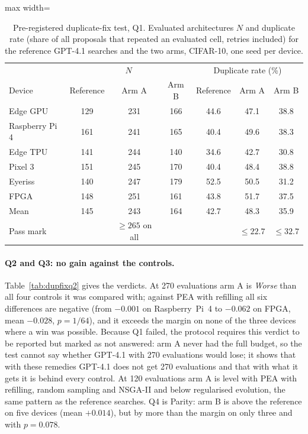 \documentclass[preprint,12pt]{elsarticle}
\begin{document}
\begin{table}[h]\centering\footnotesize
\caption{Pre-registered duplicate-fix test, Q1. Evaluated architectures $N$ and duplicate rate (share of all proposals that repeated an evaluated cell, retries included) for the reference GPT-4.1 searches and the two arms, CIFAR-10, one seed per device.}\label{tab:dupfixq1}
\setlength{\tabcolsep}{4pt}
\begin{adjustbox}{max width=\linewidth}
\begin{tabular}{l|ccc|ccc}
\toprule
 & \multicolumn{3}{c|}{$N$} & \multicolumn{3}{c}{Duplicate rate (\%)} \\
Device & Reference & Arm A & Arm B & Reference & Arm A & Arm B \\
\midrule
Edge GPU       & 129 & 231 & 166 & 44.6 & 47.1 & 38.8 \\
Raspberry Pi 4 & 161 & 241 & 165 & 40.4 & 49.6 & 38.3 \\
Edge TPU       & 141 & 244 & 140 & 34.6 & 42.7 & 30.8 \\
Pixel 3        & 151 & 245 & 170 & 40.4 & 48.4 & 38.8 \\
Eyeriss        & 140 & 247 & 179 & 52.5 & 50.5 & 31.2 \\
FPGA           & 148 & 251 & 161 & 43.8 & 51.7 & 37.5 \\
\midrule
Mean           & 145 & 243 & 164 & 42.7 & 48.3 & 35.9 \\
Pass mark      &     & $\ge265$ on all & & & $\le22.7$ & $\le32.7$ \\
\bottomrule
\end{tabular}
\end{adjustbox}
\end{table}

\paragraph{Q2 and Q3: no gain against the controls.} Table~\ref{tab:dupfixq2} gives the verdicts. At 270 evaluations arm A is \emph{Worse} than all four controls it was compared with; against PEA with refilling all six differences are negative (from $-0.001$ on Raspberry~Pi~4 to $-0.062$ on FPGA, mean $-0.028$, $p=1/64$), and it exceeds the margin on none of the three devices where a win was possible. Because Q1 failed, the protocol requires this verdict to be reported but marked as not answered: arm A never had the full budget, so the test cannot say whether GPT-4.1 with 270 evaluations would lose; it shows that with these remedies GPT-4.1 does not get 270 evaluations and that with what it gets it is behind every control. At 120 evaluations arm A is level with PEA with refilling, random sampling and NSGA-II and below regularised evolution, the same pattern as the reference searches. Q4 is Parity: arm B is above the reference on five devices (mean $+0.014$), but by more than the margin on only three and with $p=0.078$.
\end{document}
